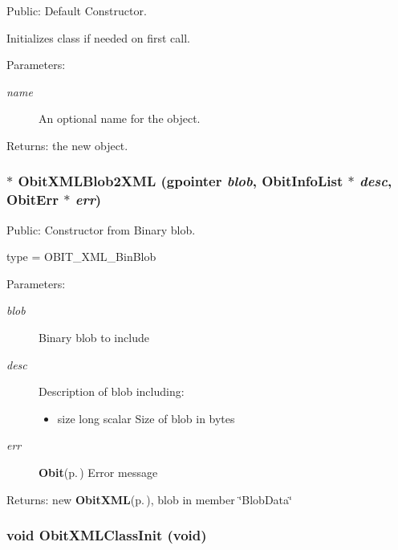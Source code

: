 Public: Default Constructor. 

Initializes class if needed on first call. \begin{Desc}
\item[Parameters:]
\begin{description}
\item[{\em name}]An optional name for the object. \end{description}
\end{Desc}
\begin{Desc}
\item[Returns:]the new object. \end{Desc}
\subsubsection{$\ast$ Obit\-XMLBlob2XML (gpointer {\em blob}, {\bf Obit\-Info\-List} $\ast$ {\em desc}, {\bf Obit\-Err} $\ast$ {\em err})}\label{ObitXML_8c_a23}


Public: Constructor from Binary blob. 

type = OBIT\_\-XML\_\-Bin\-Blob \begin{Desc}
\item[Parameters:]
\begin{description}
\item[{\em blob}]Binary blob to include \item[{\em desc}]Description of blob including: \begin{itemize}
\item size long scalar Size of blob in bytes \end{itemize}
\item[{\em err}]{\bf Obit}{\rm (p.\,\pageref{structObit})} Error message \end{description}
\end{Desc}
\begin{Desc}
\item[Returns:]new {\bf Obit\-XML}{\rm (p.\,\pageref{structObitXML})}, blob in member \char`\"{}Blob\-Data\char`\"{} \end{Desc}
\subsubsection{\setlength{\rightskip}{0pt plus 5cm}void Obit\-XMLClass\-Init (void)}\label{ObitXML_8c_a28}


